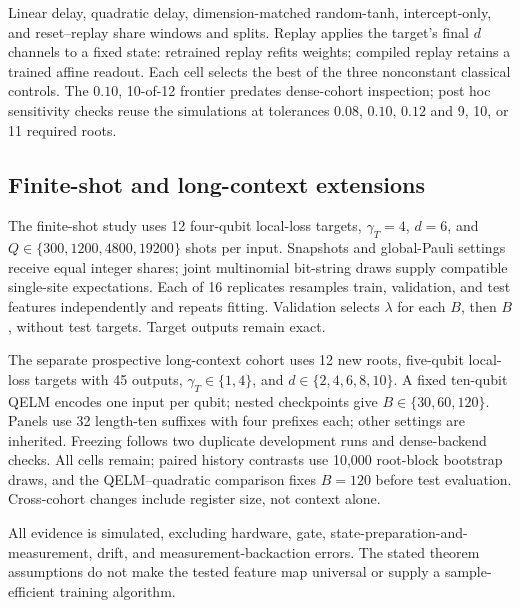 Linear delay, quadratic delay, dimension-matched random-tanh, intercept-only,
and reset--replay share windows and splits. Replay applies the target's final
$d$ channels to a fixed state: retrained replay refits weights; compiled
replay retains a trained affine readout. Each cell selects the best of the
three nonconstant classical controls. The $0.10$, 10-of-12 frontier predates
dense-cohort inspection; post hoc sensitivity checks reuse the simulations
at tolerances $0.08$, $0.10$, $0.12$ and 9, 10, or 11 required roots.

\subsection{Finite-shot and long-context extensions}

The finite-shot study uses 12 four-qubit local-loss targets,
$\gamma_T=4$, $d=6$, and $Q\in\{300,1200,4800,19200\}$ shots per input.
Snapshots and global-Pauli settings receive equal integer shares;
joint multinomial bit-string draws supply compatible single-site expectations.
Each of 16 replicates resamples train, validation, and test features
independently and repeats fitting. Validation selects $\lambda$ for each $B$,
then $B$, without test targets. Target outputs remain exact.

The separate prospective long-context cohort uses 12 new roots,
five-qubit local-loss targets with 45 outputs, $\gamma_T\in\{1,4\}$,
and $d\in\{2,4,6,8,10\}$. A fixed ten-qubit QELM encodes one input per
qubit; nested checkpoints give $B\in\{30,60,120\}$. Panels use 32
length-ten suffixes with four prefixes each; other settings are inherited.
Freezing follows two duplicate development runs and dense-backend checks.
All cells remain; paired history contrasts use 10,000 root-block
bootstrap draws, and the QELM--quadratic comparison fixes $B=120$ before
test evaluation. Cross-cohort changes include register size, not context alone.

All evidence is simulated, excluding hardware, gate,
state-preparation-and-measurement, drift, and measurement-backaction errors.
The stated theorem assumptions do not make the tested feature map universal
or supply a sample-efficient training algorithm.
